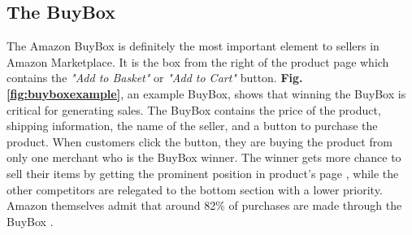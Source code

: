 {%
%
%
%
%


\subsection{The BuyBox}
\label{sec:buybox}
The Amazon BuyBox is definitely the most important element to sellers in Amazon Marketplace. 
It is the box from the right of the product page which contains the \textit{"Add to Basket"} 
or \textit{"Add to Cart"} button. \textbf{Fig.\ref{fig:buyboxexample}}, an example BuyBox, 
shows that winning the BuyBox is critical for generating sales. The BuyBox contains the price 
of the product, shipping information, the name of the seller, and a button to purchase the product.
 When customers click the button, they are buying the product from only one merchant who is the BuyBox 
 winner. The winner gets more chance to sell their items by getting the prominent position in product's 
 page , while the other competitors are relegated to the bottom section with a lower priority. Amazon 
 themselves admit that around 82\% of purchases are made through the BuyBox \cite{taftamazon}. 

}
